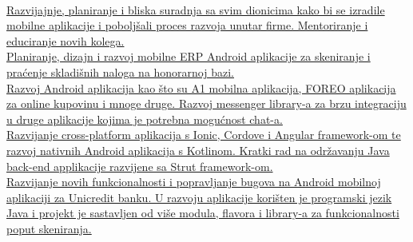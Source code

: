 \documentclass[theme]{cv_style}
\begin{document}
\begin{paracol}{2}
\begin{rightcolumn}
            \vspace{\itemspace}\\
            \href{https://www.azikus.com}{
            {Razvijajnje, planiranje i bliska suradnja sa svim dionicima kako bi se izradile mobilne aplikacije i poboljšali proces razvoja unutar firme. Mentoriranje i educiranje novih kolega.}}
            \vspace{\itemspace}\\
            \href{https://opendynamic.de/}{
            {Planiranje, dizajn i razvoj mobilne ERP Android aplikacije za skeniranje i praćenje skladišnih naloga na honorarnoj bazi.}}
            \vspace{\itemspace}\\
            \href{https://undabot.com/}{
            {Razvoj Android aplikacija kao što su A1 mobilna aplikacija, FOREO aplikacija za online kupovinu i mnoge druge. Razvoj messenger library-a za brzu integraciju u druge aplikacije kojima je potrebna mogućnost chat-a.}}
            \vspace{\itemspace}\\
            \href{https://www.combis.hr/}{
            {Razvijanje cross-platform aplikacija s Ionic, Cordove i Angular framework-om te razvoj nativnih Android aplikacija s Kotlinom. Kratki rad na održavanju Java back-end applikacije razvijene sa Strut framework-om.}}
            \vspace{\itemspace}\\
            \href{https://see.asseco.com/}{
            {Razvijanje novih funkcionalnosti i popravljanje bugova na Android mobilnoj aplikaciji za Unicredit banku. U razvoju aplikacije korišten je programski jezik Java i projekt je sastavljen od više modula, flavora i library-a za funkcionalnosti poput skeniranja.}}
            \vspace{0.1cm}\\

\end{rightcolumn}
\end{paracol}
\end{document}
